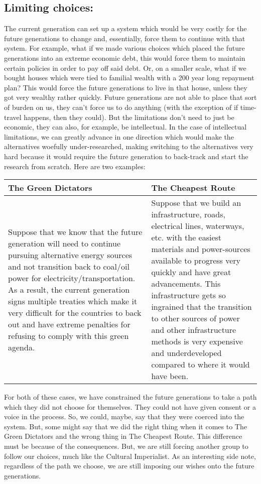 \subsection{Limiting choices:}

The current generation can set up a system which would be very costly for the future generations to change and, essentially, force them to continue with that system. For example, what if we made various choices which placed the future generations into an extreme economic debt, this would force them to maintain certain policies in order to pay off said debt. Or, on a smaller scale, what if we bought houses which were tied to familial wealth with a 200 year long repayment plan? This would force the future generations to live in that house, unless they got very wealthy rather quickly. Future generations are not able to place that sort of burden on us, they can't force us to do anything (with the exception of if time-travel happens, then they could). But the limitations don't need to just be economic, they can also, for example, be intellectual. In the case of intellectual limitations, we can greatly advance in one direction which would make the alternatives woefully under-researched, making switching to the alternatives very hard because it would require the future generation to back-track and start the research from scratch. Here are two examples: 
\noindent
\begin{tabular}{p{2.75in}|p{2.75in}}
The Green Dictators&The Cheapest Route\\\hline
Suppose that we know that the future generation will need to continue pursuing alternative energy sources and not transition back to coal/oil power for electricity/transportation. As a result, the current generation signs multiple treaties which make it very difficult for the countries to back out and have extreme penalties for refusing to comply with this green agenda.&Suppose that we build an infrastructure, roads, electrical lines, waterways, etc. with the easiest materials and power-sources available to progress very quickly and have great advancements. This infrastructure gets so ingrained that the transition to other sources of power and other infrastructure methods is very expensive and underdeveloped compared to where it would have been.\\
\end{tabular}

For both of these cases, we have constrained the future generations to take a path which they did not choose for themselves. They could not have given consent or a voice in the process. So, we could, maybe, say that they were coerced into the system. But, some might say that we did the right thing when it comes to The Green Dictators and the wrong thing in The Cheapest Route. This difference must be because of the consequences. But, we are still forcing another group to follow our choices, much like the Cultural Imperialist. As an interesting side note, regardless of the path we choose, we are still imposing our wishes onto the future generations.
